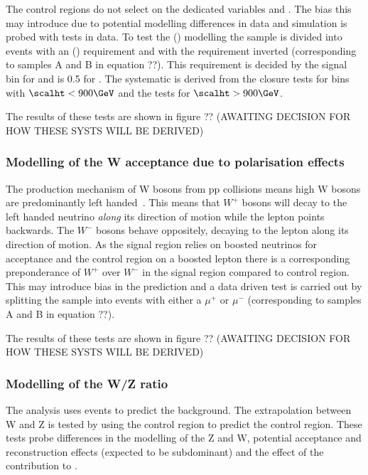 The control regions do not select on the dedicated variables \alphat and \bdphi. The
bias this may introduce due to potential modelling differences in data and simulation is
probed with tests in data. To test the \alphat (\bdphi) modelling the \mj sample is divided 
into events with an \alphat (\bdphi) requirement and with the requirement inverted (corresponding
to samples A and B in equation ??). This requirement is decided by the signal \scalht bin for 
\alphat and is 0.5 for \bdphi. The systematic is derived from the \alphat closure tests for
bins with $\scalht < 900 \GeV$ and the \bdphi tests for $\scalht > 900 \GeV$.

The results of these tests are shown in figure ?? (AWAITING DECISION FOR HOW THESE SYSTS WILL BE DERIVED)

\subsubsection{Modelling of the W acceptance due to polarisation effects}

The production mechanism of W bosons from pp collisions means high \pt W bosons are predominantly left 
handed~\cite{lhW}. This means that $W^{+}$ bosons will decay to the left handed neutrino \emph{along}
its direction of motion while the lepton points backwards. The $W^{-}$ bosons behave oppositely, decaying
to the lepton along its direction of motion. As the signal region relies on boosted neutrinos 
for acceptance and the \mj control region on a boosted lepton there is a corresponding preponderance
of $W^{+}$ over $W^{-}$ in the signal region compared to \mj control region. This may introduce bias
in the prediction and a data driven test is carried out by splitting the \mj sample into events 
with either a $\mu^{+}$ or $\mu^{-}$ (corresponding to samples A and B in equation ??).

The results of these tests are shown in figure ?? (AWAITING DECISION FOR HOW THESE SYSTS WILL BE DERIVED)

\subsubsection{Modelling of the W/Z ratio}

The \alphat analysis uses \mj events to predict the \znunu background. The extrapolation 
between W and Z is tested by using the \mj control region to predict the \mmj control region.
These tests probe differences in the modelling of the Z and W, potential acceptance and
reconstruction effects (expected to be subdominant) and the effect of 
the \ttbar contribution to \mj.

